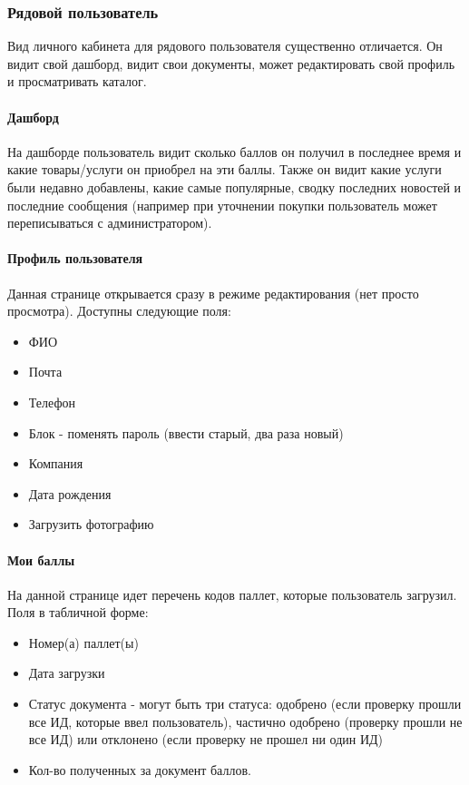 \documentclass[DIV=calc, paper=a4, fontsize=11pt]{scrartcl} %
\begin{document}
\subsubsection{Рядовой пользователь}

Вид личного кабинета для рядового пользователя существенно отличается. Он видит свой дашборд, видит свои документы, может редактировать свой профиль и просматривать каталог.


\paragraph{Дашборд}

На дашборде пользователь видит сколько баллов он получил в последнее время и какие товары/услуги он приобрел на эти баллы. Также он видит какие услуги были недавно добавлены, какие самые популярные, сводку последних новостей и последние сообщения (например при уточнении покупки пользователь может переписываться с администратором).

\paragraph{Профиль пользователя}

Данная странице открывается сразу в режиме редактирования (нет просто просмотра). Доступны следующие поля:

\begin{itemize}
	\item ФИО
	\item Почта
	\item Телефон
	\item Блок - поменять пароль (ввести старый, два раза новый)
	\item Компания
	\item Дата рождения
	\item Загрузить фотографию
\end{itemize}

\paragraph{Мои баллы}

На данной странице идет перечень кодов паллет, которые пользователь загрузил. Поля в табличной форме:

\begin{itemize}
	\item Номер(а) паллет(ы)
	\item Дата загрузки
	\item Статус документа - могут быть три статуса: одобрено (если проверку прошли все ИД, которые ввел пользователь), частично одобрено (проверку прошли не все ИД) или отклонено (если проверку не прошел ни один ИД)
	\item Кол-во полученных за документ баллов.
\end{itemize}
\end{document}
